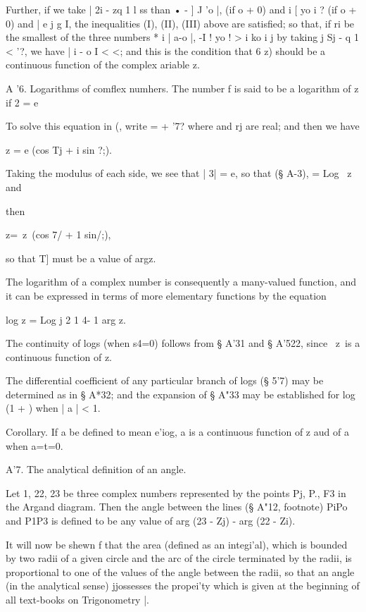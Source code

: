 Further, if we take | 2i - zq 1 l ss than • - ] J 'o |, (if o + 0)
and i [ yo i ? (if o + 0) and | e j g I, the inequalities (I), (II),
(III) above are satisfied; so that, if ri be the smallest of the
three numbers * i | a-o |, -I ! yo ! > i ko i j by taking j Sj - q 1
< '?, we have | i - o I < <; and this is the condition that 6 z)
should be a continuous function of the complex ariable z.

A '6. Logarithms of comflex numhers. The number f is said to be a
logarithm of z if 2 = e

To solve this equation in (, write = + '7? where and rj are real; and
then we have

z = e (cos Tj + i sin ?;).

Taking the modulus of each side, we see that | 3| = e, so that (§
A-3), = Log \ z\; and

then

z=\ z\ (cos 7/ + 1 sin/;),

so that T] must be a value of argz.

The logarithm of a complex number is consequently a many-valued
function, and it can be expressed in terms of more elementary
functions by the equation

log z = Log j 2 1 4- 1 arg z.

The continuity of logs (when s4=0) follows from § A'31 and § A'522,
since \ z\ is a continuous function of z.

The differential coefficient of any particular branch of logs (§ 5'7)
may be determined as in § A*32; and the expansion of § A"33 may be
established for log (1 + ) when | a | < 1.

Corollary. If a be defined to mean e'iog, a is a continuous function
of z aud of a when a=t=0.

A'7. The analytical definition of an angle.

Let 1, 22, 23 be three complex numbers represented by the points Pj,
P., F3 in the Argand diagram. Then the angle between the lines (§
A"12, footnote) PiPo and P1P3 is defined to be any value of arg (23 -
Zj) - arg (22 - Zi).

It will now be shewn f that the area (defined as an integi'al), which
is bounded by two radii of a given circle and the arc of the circle
terminated by the radii, is proportional to one of the values of the
angle between the radii, so that an angle (in the analytical sense)
jjossesses the propei'ty which is given at the beginning of all
text-books on Trigonometry |.

